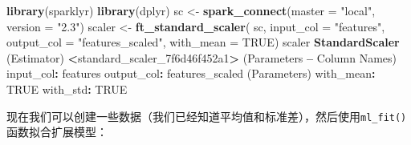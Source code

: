 \documentclass[
]{article}
\newenvironment{Shaded}{\begin{snugshade}}{\end{snugshade}}
\newcommand{\DataTypeTok}[1]{\textcolor[rgb]{0.13,0.29,0.53}{#1}}
\newcommand{\DecValTok}[1]{\textcolor[rgb]{0.00,0.00,0.81}{#1}}
\newcommand{\FloatTok}[1]{\textcolor[rgb]{0.00,0.00,0.81}{#1}}
\newcommand{\KeywordTok}[1]{\textcolor[rgb]{0.13,0.29,0.53}{\textbf{#1}}}
\newcommand{\NormalTok}[1]{#1}
\newcommand{\OperatorTok}[1]{\textcolor[rgb]{0.81,0.36,0.00}{\textbf{#1}}}
\newcommand{\OtherTok}[1]{\textcolor[rgb]{0.56,0.35,0.01}{#1}}
\newcommand{\StringTok}[1]{\textcolor[rgb]{0.31,0.60,0.02}{#1}}
\begin{document}
\begin{Shaded}
\begin{Highlighting}[]
\KeywordTok{library}\NormalTok{(sparklyr)}
\KeywordTok{library}\NormalTok{(dplyr)}
\NormalTok{sc <-}\StringTok{ }\KeywordTok{spark_connect}\NormalTok{(}\DataTypeTok{master =} \StringTok{"local"}\NormalTok{, }\DataTypeTok{version =} \StringTok{"2.3"}\NormalTok{)}
\NormalTok{scaler <-}\StringTok{ }\KeywordTok{ft_standard_scaler}\NormalTok{(}
\NormalTok{sc,}
\DataTypeTok{input_col =} \StringTok{"features"}\NormalTok{,}
\DataTypeTok{output_col =} \StringTok{"features_scaled"}\NormalTok{,}
\DataTypeTok{with_mean =} \OtherTok{TRUE}\NormalTok{)}
\NormalTok{scaler}
\KeywordTok{StandardScaler}\NormalTok{ (Estimator)}
\OperatorTok{<}\NormalTok{standard_scaler_7f6d46f452a1}\OperatorTok{>}
\StringTok{ }\NormalTok{(Parameters }\OperatorTok{--}\StringTok{ }\NormalTok{Column Names)}
\NormalTok{ input_col}\OperatorTok{:}\StringTok{ }\NormalTok{features}
\NormalTok{ output_col}\OperatorTok{:}\StringTok{ }\NormalTok{features_scaled}
\NormalTok{ (Parameters)}
\NormalTok{ with_mean}\OperatorTok{:}\StringTok{ }\OtherTok{TRUE}
\NormalTok{ with_std}\OperatorTok{:}\StringTok{ }\OtherTok{TRUE}
\end{Highlighting}
\end{Shaded}

现在我们可以创建一些数据（我们已经知道平均值和标准差），然后使用\texttt{ml\_fit()}函数拟合扩展模型：

\begin{Shaded}
\end{Shaded}
\end{document}
